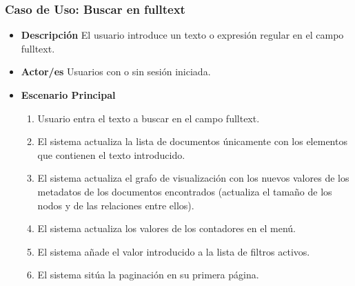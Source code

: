 \subsubsection{Caso de Uso: Buscar en \gls{fulltext}}
\begin{itemize}
	\item{\textbf{Descripción}} El usuario introduce un texto o expresión regular en el campo \gls{fulltext}.
    \item{\textbf{Actor/es}} Usuarios con o sin sesión iniciada.
    \item{\textbf{Escenario Principal}}
    	\begin{enumerate}
        	\item Usuario entra el texto a buscar en el campo \gls{fulltext}.
        	\item El sistema actualiza la lista de documentos únicamente con los elementos que contienen el texto introducido.
            \item El sistema actualiza el grafo de visualización con los nuevos valores de los \glspl{metadato} de los documentos encontrados (actualiza el tamaño de los nodos y de las relaciones entre ellos).
            \item El sistema actualiza los valores de los contadores en el menú.
            \item El sistema añade el valor introducido a la lista de filtros activos.
            \item El sistema sitúa la paginación en su primera página.
        \end{enumerate}
\end{itemize}



